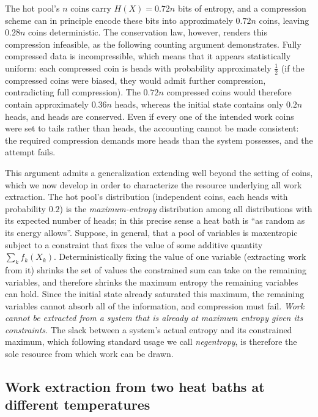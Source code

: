 \documentclass[11pt]{article}
\begin{document}
The hot pool's $n$ coins carry $H(X) = 0.72n$ bits of entropy, and a compression scheme can in principle encode these bits into approximately $0.72n$ coins, leaving $0.28n$ coins deterministic. The conservation law, however, renders this compression infeasible, as the following counting argument demonstrates. Fully compressed data is incompressible, which means that it appears statistically uniform: each compressed coin is heads with probability approximately $\frac12$ (if the compressed coins were biased, they would admit further compression, contradicting full compression). The $0.72n$ compressed coins would therefore contain approximately $0.36n$ heads, whereas the initial state contains only $0.2n$ heads, and heads are conserved. Even if every one of the intended work coins were set to tails rather than heads, the accounting cannot be made consistent: the required compression demands more heads than the system possesses, and the attempt fails.

This argument admits a generalization extending well beyond the setting of coins, which we now develop in order to characterize the resource underlying all work extraction. The hot pool's distribution (independent coins, each heads with probability $0.2$) is the \emph{maximum-entropy} distribution among all distributions with its expected number of heads; in this precise sense a heat bath is ``as random as its energy allows''. Suppose, in general, that a pool of variables is maxentropic subject to a constraint that fixes the value of some additive quantity $\sum_k f_k(X_k)$. Deterministically fixing the value of one variable (extracting work from it) shrinks the set of values the constrained sum can take on the remaining variables, and therefore shrinks the maximum entropy the remaining variables can hold. Since the initial state already saturated this maximum, the remaining variables cannot absorb all of the information, and compression must fail. \emph{Work cannot be extracted from a system that is already at maximum entropy given its constraints.} The slack between a system's actual entropy and its constrained maximum, which following standard usage we call \emph{negentropy}, is therefore the sole resource from which work can be drawn.

\subsection{Work extraction from two heat baths at different temperatures}
\label{sec:twobaths}
\end{document}
